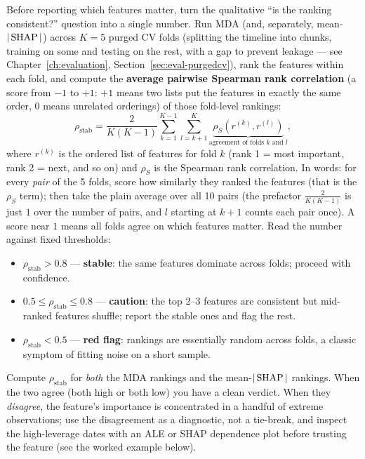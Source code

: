 \begin{keyidea}
Before reporting which features matter, turn the qualitative ``is the ranking consistent?'' question into a single number. Run MDA (and, separately, mean-$|\operatorname{SHAP}|$) across $K = 5$ purged CV folds (splitting the timeline into chunks, training on some and testing on the rest, with a gap to prevent leakage --- see Chapter~\ref{ch:evaluation}, Section~\ref{sec:eval-purgedcv}), rank the features within each fold, and compute the \textbf{average pairwise Spearman rank correlation} (a score from $-1$ to $+1$: $+1$ means two lists put the features in exactly the same order, $0$ means unrelated orderings) of those fold-level rankings:
\begin{equation}\label{eq:importance-stability}
\rho_{\text{stab}} = \frac{2}{K(K-1)} \sum_{k=1}^{K-1} \sum_{l=k+1}^{K} \underbrace{\rho_S\!\left(r^{(k)}, r^{(l)}\right)}_{\text{agreement of folds } k \text{ and } l},
\end{equation}
where $r^{(k)}$ is the ordered list of features for fold $k$ (rank 1 = most important, rank 2 = next, and so on) and $\rho_S$ is the Spearman rank correlation. In words: for every \emph{pair} of the 5 folds, score how similarly they ranked the features (that is the $\rho_S$ term); then take the plain average over all 10 pairs (the prefactor $\tfrac{2}{K(K-1)}$ is just $1$ over the number of pairs, and $l$ starting at $k+1$ counts each pair once). A score near $1$ means all folds agree on which features matter. Read the number against fixed thresholds:
\begin{itemize}[nosep]
  \item $\rho_{\text{stab}} > 0.8$ --- \textbf{stable}: the same features dominate across folds; proceed with confidence.
  \item $0.5 \le \rho_{\text{stab}} \le 0.8$ --- \textbf{caution}: the top 2--3 features are consistent but mid-ranked features shuffle; report the stable ones and flag the rest.
  \item $\rho_{\text{stab}} < 0.5$ --- \textbf{red flag}: rankings are essentially random across folds, a classic symptom of fitting noise on a short sample.
\end{itemize}
Compute $\rho_{\text{stab}}$ for \emph{both} the MDA rankings and the mean-$|\operatorname{SHAP}|$ rankings. When the two agree (both high or both low) you have a clean verdict. When they \emph{disagree}, the feature's importance is concentrated in a handful of extreme observations; use the disagreement as a diagnostic, not a tie-break, and inspect the high-leverage dates with an ALE or SHAP dependence plot before trusting the feature (see the worked example below).
\end{keyidea}

